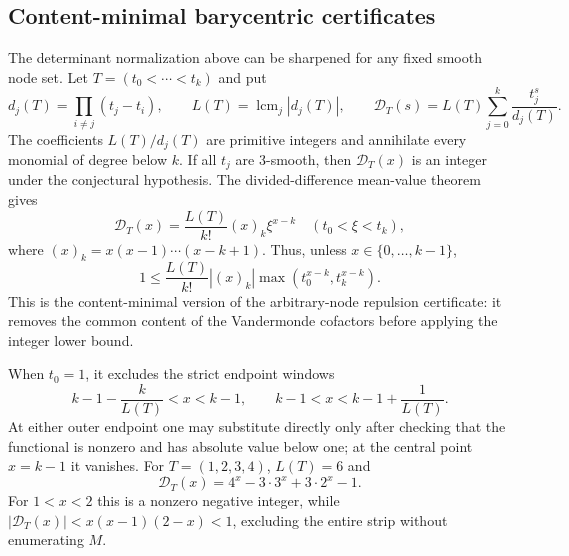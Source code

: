 \documentclass[11pt,oneside]{article}
\theoremstyle{definition}
\theoremstyle{remark}
\begin{document}
\subsection{Content-minimal barycentric certificates}
\label{df:cleared-divided-differences}

The determinant normalization above can be sharpened for any fixed smooth node set.  Let
$T=(t_0<\cdots<t_k)$ and put
\[
 d_j(T)=\prod_{i\ne j}(t_j-t_i),\qquad
 L(T)=\operatorname{lcm}_j|d_j(T)|,\qquad
 \mathcal D_T(s)=L(T)\sum_{j=0}^k\frac{t_j^s}{d_j(T)}.
\]
The coefficients $L(T)/d_j(T)$ are primitive integers and annihilate every monomial of
degree below $k$.  If all $t_j$ are $3$-smooth, then $\mathcal D_T(x)$ is an integer under
the conjectural hypothesis.  The divided-difference mean-value theorem gives
\begin{equation}
 \mathcal D_T(x)=\frac{L(T)}{k!}(x)_k\xi^{x-k}
 \quad(t_0<\xi<t_k),
 \label{df:eq-cleared-divided-difference}
\end{equation}
where $(x)_k=x(x-1)\cdots(x-k+1)$.  Thus, unless
$x\in\{0,\ldots,k-1\}$,
\begin{equation}
 1\le\frac{L(T)}{k!}|(x)_k|
 \max(t_0^{x-k},t_k^{x-k}).
 \label{df:eq-cleared-gap}
\end{equation}
This is the content-minimal version of the arbitrary-node repulsion certificate: it removes
the common content of the Vandermonde cofactors before applying the integer lower bound.

When $t_0=1$, it excludes the strict endpoint windows
\begin{equation}
 k-1-\frac{k}{L(T)}<x<k-1,\qquad
 k-1<x<k-1+\frac1{L(T)}.
 \label{df:eq-cleared-windows}
\end{equation}
At either outer endpoint one may substitute directly only after checking that the functional
is nonzero and has absolute value below one; at the central point $x=k-1$ it vanishes.
For $T=(1,2,3,4)$, $L(T)=6$ and
\[
 \mathcal D_T(x)=4^x-3\cdot3^x+3\cdot2^x-1.
\]
For $1<x<2$ this is a nonzero negative integer, while
$|\mathcal D_T(x)|<x(x-1)(2-x)<1$, excluding the entire strip without enumerating $M$.
\end{document}
